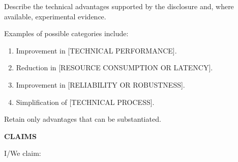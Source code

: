\documentclass[12pt,a4paper]{article}
\begin{document}
Describe the technical advantages supported by the
disclosure and, where available, experimental evidence.

Examples of possible categories include:

\begin{enumerate}
    \item Improvement in [TECHNICAL PERFORMANCE].
    \item Reduction in [RESOURCE CONSUMPTION OR LATENCY].
    \item Improvement in [RELIABILITY OR ROBUSTNESS].
    \item Simplification of [TECHNICAL PROCESS].
\end{enumerate}

Retain only advantages that can be substantiated.


\newpage

\begin{center}
    \textbf{\Large CLAIMS}
\end{center}

I/We claim:
\end{document}
